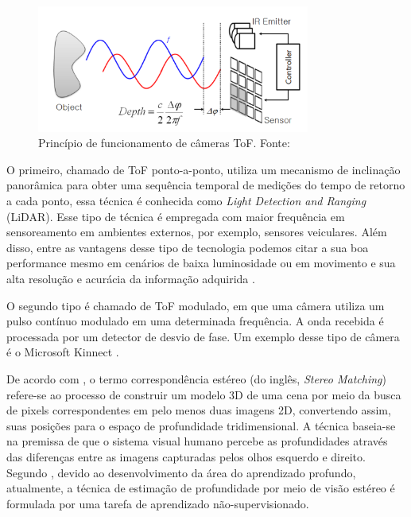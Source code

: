 \begin{figure}[h]
    \centering   
    \includegraphics[width=0.8\textwidth]{fig/tof_cameras.png}
    \caption{Princípio de funcionamento de câmeras ToF. Fonte: \cite{hansard2012time}}
    \label{fig:tof}
\end{figure}

 O primeiro, chamado de ToF ponto-a-ponto, utiliza um mecanismo de inclinação panorâmica para obter uma sequência temporal de medições do tempo de retorno a cada ponto, essa técnica é conhecida como \textit{Light Detection and Ranging} (LiDAR). Esse tipo de técnica é empregada com maior frequência em sensoreamento em ambientes externos, por exemplo, sensores veiculares. Além disso, entre as vantagens desse tipo de tecnologia podemos citar a sua boa performance mesmo em cenários de baixa luminosidade ou em movimento e sua alta resolução e acurácia da informação adquirida \cite{zollhofer2019commodity}.


O segundo tipo é chamado de ToF modulado, em que uma câmera utiliza um pulso contínuo modulado em uma determinada frequência. A onda recebida é processada por um detector de desvio de fase. Um exemplo desse tipo de câmera é o Microsoft Kinnect \cite{zollhofer2019commodity}.

De acordo com , o termo correspondência estéreo (do inglês, \textit{Stereo Matching}) refere-se ao processo de construir um modelo 3D de uma cena por meio da busca de pixels correspondentes em pelo menos duas imagens 2D, convertendo assim, suas posições para o espaço de profundidade tridimensional. A técnica baseia-se na premissa de que o sistema visual humano percebe as profundidades através das diferenças entre as imagens capturadas pelos olhos esquerdo e direito. Segundo , devido ao desenvolvimento da área do aprendizado profundo, atualmente, a técnica de estimação de profundidade por meio de visão estéreo é formulada por uma tarefa de aprendizado não-supervisionado.



